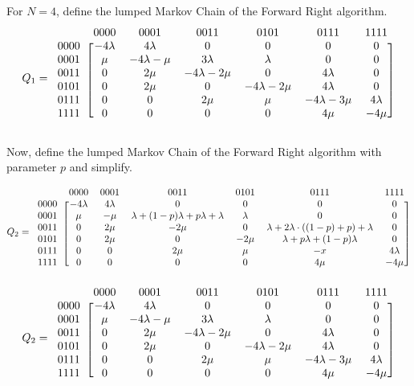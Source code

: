 \documentclass[10pt,a4paper]{article}
\begin{document}
For $N=4$, define the lumped Markov Chain of the Forward Right algorithm.
\[ Q_1 =
  \begin{blockarray}{ccccccc}
    & 0000 & 0001 & 0011 & 0101 & 0111 & 1111 \\
    \begin{block}{c[cccccc]}
    0000 & -4\lambda & 4\lambda & 0 & 0 & 0 & 0 \\
    0001 & \mu & -4\lambda-\mu & 3\lambda & \lambda & 0 & 0 \\
    0011 & 0 & 2\mu & -4\lambda-2\mu & 0 & 4\lambda & 0 \\
    0101 & 0 & 2\mu & 0 & -4\lambda-2\mu & 4\lambda & 0  \\
    0111 & 0 & 0 & 2\mu & \mu & -4\lambda-3\mu & 4\lambda \\
    1111 & 0 & 0 & 0 & 0 & 4\mu & -4\mu \\
    \end{block}
  \end{blockarray}
\]

Now, define the lumped Markov Chain of the Forward Right algorithm with parameter $p$ and simplify.

\[ Q_2 =
  \begin{blockarray}{ccccccc}
    & 0000 & 0001 & 0011 & 0101 & 0111 & 1111 \\
    \begin{block}{c[cccccc]}
    0000 & -4 \lambda & 4\lambda & 0 & 0 & 0 & 0 \\
    0001 & \mu & -\mu & \lambda + (1-p)\lambda+p\lambda+\lambda & \lambda & 0 & 0 \\
    0011 & 0 & 2\mu & -2\mu & 0 & \lambda+2\lambda \cdot ((1-p)+p)+\lambda & 0 \\
    0101 & 0 & 2\mu & 0 & -2\mu & \lambda+p\lambda+(1-p)\lambda & 0  \\
    0111 & 0 & 0 & 2\mu & \mu & -x & 4\lambda \\
    1111 & 0 & 0 & 0 & 0 & 4\mu & -4\mu \\
    \end{block}
  \end{blockarray}
\]
\[ Q_2 =
  \begin{blockarray}{ccccccc}
    & 0000 & 0001 & 0011 & 0101 & 0111 & 1111 \\
    \begin{block}{c[cccccc]}
    0000 & -4\lambda & 4\lambda & 0 & 0 & 0 & 0 \\
    0001 & \mu & -4\lambda-\mu & 3\lambda & \lambda & 0 & 0 \\
    0011 & 0 & 2\mu & -4\lambda-2\mu & 0 & 4\lambda & 0 \\
    0101 & 0 & 2\mu & 0 & -4\lambda-2\mu & 4\lambda & 0  \\
    0111 & 0 & 0 & 2\mu & \mu & -4\lambda-3\mu & 4\lambda \\
    1111 & 0 & 0 & 0 & 0 & 4\mu & -4\mu \\
    \end{block}
  \end{blockarray}
\]
\end{document}
